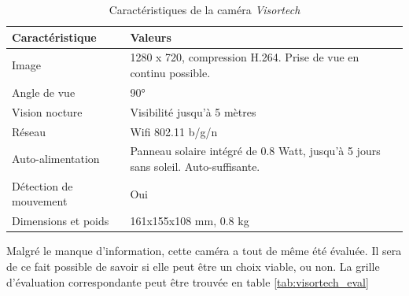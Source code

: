 \begin{table}[H]
    \centering
    \caption{Caractéristiques de la caméra \textit{Visortech}}
    \label{tab:visortech_spec}
    \begin{tabular}{@{}ll@{}}
    \toprule
    Caractéristique        & Valeurs                                                          \\ \midrule
    Image                  & 1280 x 720, compression H.264. Prise de vue en continu possible. \\ [0.8ex]
    Angle de vue           & 90°                                                              \\ [0.8ex]
    Vision nocture         & Visibilité jusqu'à 5 mètres                                      \\ [0.8ex]
    Réseau                 & Wifi 802.11 b/g/n                                                \\ [0.8ex]
    Auto-alimentation      & Panneau solaire intégré de 0.8 Watt, jusqu'à 5 jours sans soleil. Auto-suffisante.     \\ [0.8ex]
    Détection de mouvement & Oui                                                              \\ [0.8ex]
    Dimensions et poids    & 161x155x108 mm, 0.8 kg                                            \\  [0.8ex]\bottomrule
    \end{tabular}
\end{table}

Malgré le manque d'information, cette caméra a tout de même été évaluée. Il sera de ce fait possible de savoir si elle peut être un choix viable, ou non. La grille d'évaluation correspondante peut être trouvée en table \ref{tab:visortech_eval}


